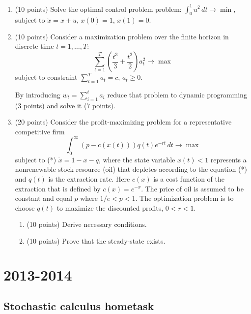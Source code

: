 \documentclass[pdftex,12pt,a4paper]{article}
\begin{document}
\begin{enumerate}[resume]
\item (10 points) Solve the optimal control problem problem: $\int_0^1 u^2 \, dt \to \min$, subject to $\dot{x}=x+u$, $x(0)=1$, $x(1)=0$.
\item (10 points) Consider a maximization problem over the finite horizon in discrete time $t=1,\ldots,T$:
\[
\sum_{t=1}^{T} \left(\frac{t^3}{3}+\frac{t^2}{2}\right)a_t^2 \to \max
\] 
subject to constraint $\sum_{t=1}^T a_t=c$, $a_t \geq 0$.  

By introducing $w_t=\sum_{i=1}^t a_i$  reduce that problem to dynamic programming (3 points) and solve it (7 points).  

\item (20 points) Consider the profit-maximizing problem for a representative competitive firm 
\[
\int_0^{\infty} (p-c(x(t)))q(t)e^{-rt} \, dt \to \max
\]
subject to (*) $\dot{x}=1-x-q$, where the state variable  $x(t)<1$ represents a nonrenewable stock resource (oil) that depletes according to the equation (*) and $q(t)$ is the extraction rate. Here $c(x)$ is a cost function of the extraction that is defined by $c(x)=e^{-x}$. The price of oil is assumed to be constant and equal $p$ where $1/e<p<1$.  The optimization problem is to choose $q(t)$ to maximize the discounted profits, $0<r<1$.
\begin{enumerate}
\item (10 points) Derive necessary conditions.
\item (10 points) Prove that the steady-state exists.
\end{enumerate}
\end{enumerate}

\section{2013-2014}

\subsection{Stochastic calculus hometask}
\end{document}
